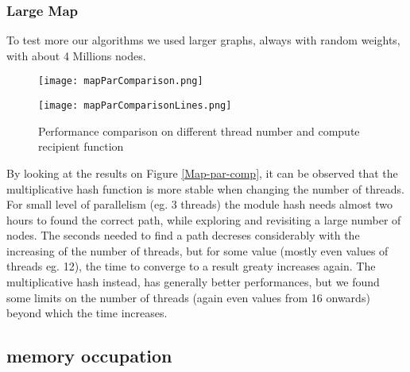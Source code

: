\subsubsection{Large Map}

To test more our algorithms we used larger graphs, always with random weights, with about 4 Millions nodes.

\begin{figure}
    \centering
    \texttt{[image: mapParComparison.png]}
    \label{Map-par-comp}
    
    \texttt{[image: mapParComparisonLines.png]}
    \label{Map-par-comp-lines}
    \caption{Performance comparison on different thread number and compute recipient function}
\end{figure}


By looking at the results on Figure \ref{Map-par-comp}, it can be observed that the multiplicative hash function is more stable when changing the number of threads.
For small level of parallelism (eg. 3 threads) the module hash needs almost two hours to found the correct path, while exploring and revisiting a large number of nodes.
The seconds needed to find a path decreses considerably with the increasing of the number of threads, but for some value (mostly even values of threads eg. 12), the time to converge to a result greaty increases again.
The multiplicative hash instead, has generally better performances, but we found some limits on the number of threads (again even values from 16 onwards) beyond which the time increases.


\subsection{memory occupation}




